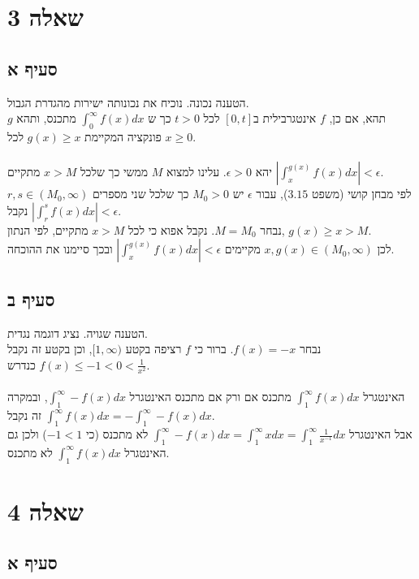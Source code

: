 \documentclass{article}
\begin{document}
\section*{שאלה 3}

\subsection*{סעיף א}

הטענה נכונה. נוכיח את נכונותה ישירות מהגדרת הגבול. \\
תהא, אם כן, $f$
אינטגרבילית ב$[0,t]$
לכל $t>0$
כך ש $\int_0^\infty f(x)dx$ מתכנס,
ותהא $g$ פונקציה המקיימת $g(x)\geq x$ לכל $x\geq 0$.
\\\\
יהא $\epsilon >0$.
עלינו למצוא $M$
ממשי כך שלכל $x>M$ מתקיים $\left| \int_x^{g(x)}f(x)dx \right| < \epsilon$. \\
לפי מבחן קושי (משפט $3.15$),
עבור $\epsilon$ יש $M_0>0$
כך שלכל שני מספרים $r,s\in(M_0, \infty)$ נקבל $\left| \int_r^sf(x)dx \right| < \epsilon$. \\
נבחר $M=M_0$. נקבל אפוא כי לכל $x>M$ מתקיים, לפי הנתון, $g(x)\geq x > M$. \\
לכן $x, g(x)\in (M_0, \infty)$ מקיימים $\left| \int_x^{g(x)}f(x)dx \right| < \epsilon$
ובכך סיימנו את ההוכחה.

\subsection*{סעיף ב}

הטענה שגויה. נציג דוגמה נגדית. \\
נבחר $f(x)=-x$. ברור כי $f$ רציפה בקטע $[1, \infty)$,
וכן בקטע זה נקבל $f(x) \leq -1 < 0 < \frac{1}{x^2}$ כנדרש.
\\\\
האינטגרל $\int_1^{\infty} f(x)dx$ מתכנס אם ורק אם מתכנס האינטגרל $\int_1^{\infty}-f(x)dx$,
ובמקרה זה נקבל $\int_1^{\infty}f(x)dx=-\int_1^{\infty}-f(x)dx$. \\
אבל האינטגרל $\int_1^{\infty}-f(x)dx=\int_1^{\infty}xdx=\int_1^{\infty} \frac{1}{x^{-1}} dx$
לא מתכנס (כי $-1<1$)
ולכן גם האינטגרל $\int_1^{\infty}f(x)dx$ לא מתכנס.

\pagebreak

\section*{שאלה 4}

\subsection*{סעיף א}
\end{document}
